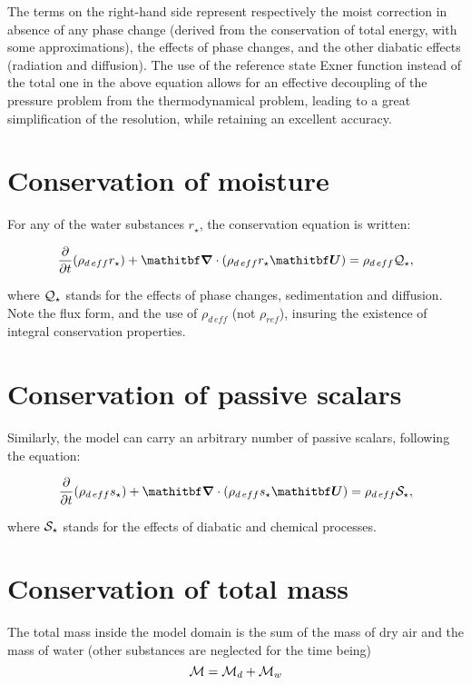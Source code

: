 The terms on the right-hand side represent respectively the moist correction
in absence of any phase change (derived from the conservation of total
energy, with some approximations), the effects of phase changes, and the other
diabatic effects (radiation and diffusion). The use of the reference state
Exner function instead of the total one in the above equation allows for an
effective decoupling of the pressure problem from the thermodynamical
problem, leading to a great simplification of the resolution, while
retaining an excellent accuracy.

\section{Conservation of moisture}

For any of the water substances $r_{\star}$, the conservation equation
is written:

\begin{equation}
\dfrac{\partial}{\partial t}(\rho_{d\,eff} r_{\star})  + \vec{ \nabla} \cdot
(\rho_{d\,eff} r_{\star} \vec{U}) = \rho_{d\,eff} {\cal Q}_{\star},
\end{equation}

where ${\cal Q}_{\star}$ stands for the effects of phase changes, sedimentation
and diffusion. Note the flux form, and the use of $\rho_{d\,eff}$
(not $\rho_{ref}$),
insuring the existence of integral conservation properties.

\section{Conservation of passive scalars}

Similarly, the model can carry an arbitrary number of passive scalars,
following the equation:

\begin{equation}
\dfrac{\partial}{\partial t}(\rho_{d\,eff} s_{\star})  + \vec{ \nabla} \cdot
(\rho_{d\,eff} s_{\star} \vec{U}) = \rho_{d\,eff} {\cal S}_{\star},
\end{equation}

where ${\cal S}_{\star}$ stands for the effects of  diabatic and chemical
processes.

\section{Conservation of total mass}

The total mass inside the model domain is the sum of the mass of dry air
and the mass of water (other substances are neglected for the time
being)
\begin{equation}
{\cal M}={\cal M}_d + {\cal M}_w
\end{equation}

